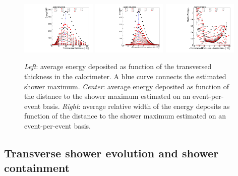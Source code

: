 \begin{figure}[h!]
  \begin{center}
   \includegraphics[width=0.32\textwidth]{figures/version_3_rawprof}
    \includegraphics[width=0.32\textwidth]{figures/version_3_cenprof}
    \includegraphics[width=0.32\textwidth]{figures/version_3_crelunc}
    \caption{{\em Left}: average energy deposited as function of the
      transversed thickness in the calorimeter. A blue curve connects
      the estimated shower maximum.
     {\em Center}: average energy deposited as function of the distance
     to the shower maximum estimated on an event-per-event basis.
    {\em Right}: average relative width of the energy deposits as
    function of the distance to the shower maximum estimated on an event-per-event basis.
   }
    \label{fig:longprofiles}
  \end{center}
\end{figure}

\subsection{Transverse shower evolution and shower containment}
\label{subsec:transvevol}

